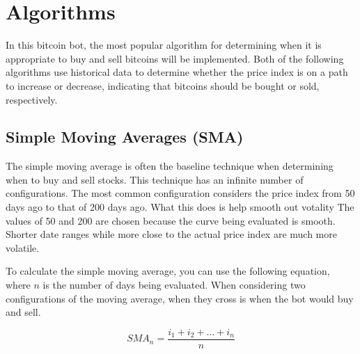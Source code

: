 \section{Algorithms}

In this bitcoin bot, the most popular algorithm for determining when it is appropriate to buy and sell bitcoins
will be implemented. Both of the following algorithms use historical
data to determine whether the price index is on a path to increase or decrease, indicating that bitcoins
should be bought or sold, respectively.

\subsection{Simple Moving Averages (SMA)}

The simple moving average is often the baseline technique when determining when to buy and sell stocks.
This technique has an infinite number of configurations. The most common configuration considers
the price index from 50 days ago to that of 200 days ago. What this does is help smooth out votality
The values of 50 and 200 are chosen because the curve being evaluated is smooth. Shorter date ranges
while more close to the actual price index are much more volatile.

To calculate the simple moving average, you can use the following equation, where $n$ is the number
of days being evaluated. When considering two configurations of the moving average, when they cross
is when the bot would buy and sell.

\begin{equation}
  SMA_n = \frac{i_1 + i_2 + \dots + i_n}{n}
\end{equation}


